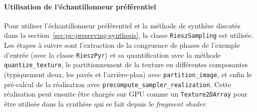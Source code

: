 \paragraph{Utilisation de l'échantillonneur préférentiel}

Pour utiliser l'échantillonneur préférentiel et la méthode de synthèse discutés dans la section~\ref{sec:pc-preserving-synthesis}, la classe \texttt{RieszSampling} est utilisée. Les étapes à suivre sont l'extraction de la congruence de phases de l'exemple d'entrée (avec la classe \texttt{RieszPyr}) et sa quantification avec la méthode \texttt{quantize\_texture}, le partitionnement de la texture en différentes composantes (typiquement deux, les pavés et l'arrière-plan) avec \texttt{partition\_image}, et enfin le pré-calcul de la réalisation avec \texttt{precompute\_sampler\_realization}. Cette réalisation peut ensuite être chargée sur GPU comme un \texttt{Texture2DArray} pour être utilisée dans la synthèse qui se fait depuis le \textit{fragment shader}.